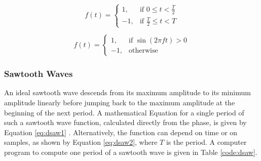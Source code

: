 \documentclass[12pt,twoside]{report}
\begin{document}
\begin{multicols}{2}

  \begin{equation}
    f(t) =
    \begin{cases}
      1,& \text{if } 0 \leq t < \frac{T}{2}\\
      -1,& \text{if } \frac{T}{2} \leq t < T
    \end{cases}
    \label{eq:dsquare1}
  \end{equation}

  \begin{equation}
    f(t) =
    \begin{cases}
      1,& \text{if } \sin(2 \pi f t) > 0\\
      -1,& \text{otherwise}
    \end{cases}
    \label{eq:dsquare2}
  \end{equation}

\end{multicols}

\begin{table}
\end{table}

\subsubsection{Sawtooth Waves}

An ideal sawtooth wave descends from its maximum amplitude to its minimum amplitude linearly before jumping back to the maximum amplitude at the beginning of the next period. A mathematical Equation for a single period of such a sawtooth wave function, calculated directly from the phase, is given by Equation \ref{eq:dsaw1} . Alternatively, the function can depend on time or on samples, as shown by Equation \ref{eq:dsaw2}, where $T$ is the period. A computer program to compute one period of a sawtooth wave is given in Table \ref{code:dsaw}.
\end{document}
